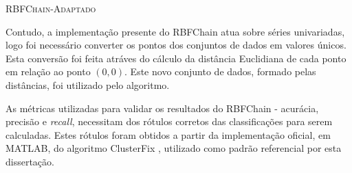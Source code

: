 \documentclass[msc, classic, a4paper]{ufbathesis}
\begin{document}
\begin{algorithm}[H]
    \SetAlgoLined

    \caption{\textsc{RBFChain-Adaptado}}
    \label{alg:rbfchain_adaptado}
\end{algorithm}
\vspace{7pt}

Contudo, a implementação presente do RBFChain atua sobre séries univariadas, logo foi necessário converter os pontos dos conjuntos de dados em valores únicos.
Esta conversão foi feita atráves do cálculo da distância Euclidiana de cada ponto em relação ao ponto $(0, 0)$.
Este novo conjunto de dados, formado pelas distâncias, foi utilizado pelo algoritmo.

As métricas utilizadas para validar os resultados do RBFChain - acurácia, precisão e \textit{recall}, necessitam dos rótulos corretos das classificações para serem calculadas. Estes rótulos foram obtidos a partir da implementação oficial, em MATLAB, do algoritmo ClusterFix \cite{KONIG2014121}, utilizado como padrão referencial por esta dissertação.
\end{document}
